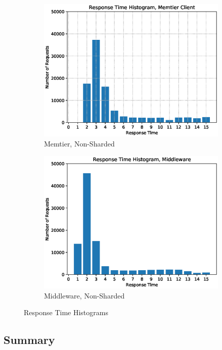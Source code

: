 \documentclass[11pt,a4paper]{article}
\begin{document}
\begin{figure}[H]
    \begin{subfigure}{.5\textwidth}
        \includegraphics[width=1\linewidth]{plots/logSection5d_histogramMemtier.eps}
        \caption{Memtier, Non-Sharded}
    \end{subfigure}
    \begin{subfigure}{.5\textwidth}
        \includegraphics[width=1\linewidth]{plots/logSection5d_histogramMiddleware.eps}
        \caption{Middleware, Non-Sharded}
    \end{subfigure}
    \caption{Response Time Histograms}
    \label{fig:5-1:Histograms}
\end{figure}

\subsection{Summary}
\end{document}
